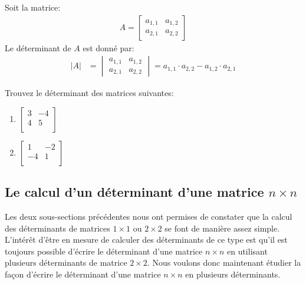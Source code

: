 \documentclass[]{book}
\providecommand{\tightlist}{%
  \setlength{\itemsep}{0pt}\setlength{\parskip}{0pt}}
\theoremstyle{definition}
\theoremstyle{definition}
\theoremstyle{definition}
\theoremstyle{remark}
\let\BeginKnitrBlock\begin \let\EndKnitrBlock\end
\begin{document}
\BeginKnitrBlock{definition}
\protect\hypertarget{def:unnamed-chunk-89}{}{\label{def:unnamed-chunk-89} }Soit la matrice:
\begin{align*}
A = \begin{bmatrix}
a_{1,1} & a_{1,2} \\
a_{2,1} & a_{2,2}
\end{bmatrix}
\end{align*}
Le déterminant de \(A\) est donné par:
\begin{align*}
\vert A\vert &= \begin{vmatrix}
a_{1,1} & a_{1,2} \\
a_{2,1} & a_{2,2}
\end{vmatrix}
=
a_{1,1}\cdot a_{2,2}-a_{1,2}\cdot a_{2,1}
\end{align*}
\EndKnitrBlock{definition}

\BeginKnitrBlock{example}
\protect\hypertarget{exm:unnamed-chunk-90}{}{\label{exm:unnamed-chunk-90} }Trouvez le déterminant des matrices suivantes:

\begin{enumerate}
\def\labelenumi{\alph{enumi}.}
\tightlist
\item
  \(\begin{bmatrix} 3&-4\\ 4&5\\ \end{bmatrix}\)
\item
  \(\begin{bmatrix} 1&-2\\ -4&1\\ \end{bmatrix}\)
\end{enumerate}
\EndKnitrBlock{example}

\hypertarget{le-calcul-dun-duxe9terminant-dune-matrice-ntimes-n}{%
\subsection{\texorpdfstring{Le calcul d'un déterminant d'une matrice \(n\times n\)}{Le calcul d'un déterminant d'une matrice n\textbackslash{}times n}}\label{le-calcul-dun-duxe9terminant-dune-matrice-ntimes-n}}

Les deux sous-sections précédentes nous ont permises de constater que la calcul des déterminants de matrices \(1\times 1\) ou \(2\times 2\) se font de manière assez simple. L'intérêt d'être en mesure de calculer des déterminants de ce type est qu'il est toujours possible d'écrire le déterminant d'une matrice \(n\times n\) en utilisant plusieurs déterminants de matrice \(2\times 2\). Nous voulons donc maintenant étudier la façon d'écrire le déterminant d'une matrice \(n\times n\) en plusieurs déterminants.
\end{document}
